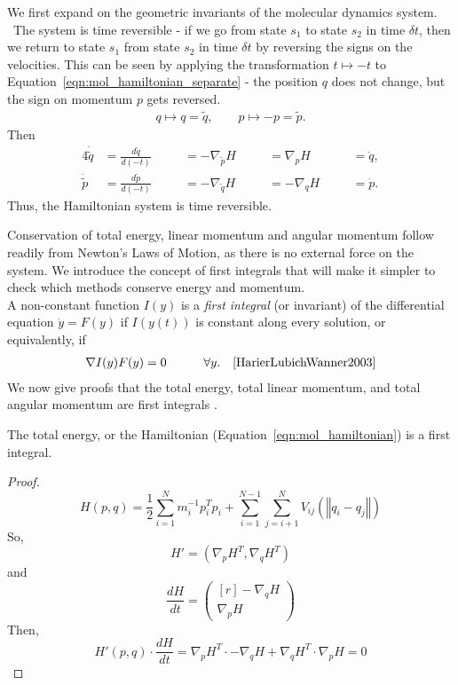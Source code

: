 \documentclass[../Main.tex]{subfiles}
\begin{document}
We first expand on the geometric invariants of the molecular dynamics system. \\\
The system is time reversible - if we go from state $s_{1}$ to state $s_{2}$ in time $\delta t$, then we return to state $s_{1}$ from state $s_{2}$ in time $\delta t$ by reversing the signs on the velocities. This can be seen by applying the transformation $t \mapsto -t$ to Equation~\ref{eqn:mol_hamiltonian_separate} - the position $q$ does not change, but the sign on momentum $p$ gets reversed.
\begin{align*}
q \mapsto q = \tilde{q},  \quad \quad p \mapsto -p = \tilde{p}.
\end{align*}
Then
\begin{alignat*}{4}
	\dot{\tilde{q}} &= \frac{d\tilde{q}}{d\left(-t\right)} \quad &&= -\nabla_{\tilde{p}}H \quad &&= \nabla_{p}H \quad &&= \dot{q},\\
	\dot{\tilde{p}} &= \frac{d\tilde{p}}{d\left(-t\right)} \quad &&= -\nabla_{\tilde{q}}H \quad && =-\nabla_{q}H \quad &&= \dot{p}.
\end{alignat*}
Thus, the Hamiltonian system is time reversible.

Conservation of total energy, linear momentum and angular momentum follow readily from Newton's Laws of Motion, as there is no external force on the system. We introduce the concept of first integrals that will make it simpler to check which methods conserve energy and momentum. \\
A non-constant function $I(y)$ is a \textit{first integral} (or invariant) of the  differential equation $\dot{y} = F(y)$ if $I(y(t))$ is constant along every solution, or equivalently, if
\begin{align}
\nabla I(y)F(y) = 0    \quad \quad \quad  \forall y. \quad \cite{HarierLubichWanner2003}
\end{align}
We now give proofs that the total energy, total linear momentum, and total angular momentum are first integrals \cite{HarierLubichWanner2003}.
\begin{theorem} The total energy, or the Hamiltonian (Equation~\ref{eqn:mol_hamiltonian}) is a first integral. \end{theorem}
\begin{proof}
$$
H(p, q) = \frac{1}{2}\sum_{i = 1}^{N} m_{i}^{-1}p_{i}^{T}p_{i} + \sum_{i=1}^{N-1} \sum_{j=i+1}^{N} V_{ij}\left(\left\Vert q_{i} - q_{j} \right\Vert\right)
$$
So,
$$
	H' = \left(\nabla_{p}H^{T}, \nabla_{q}H^{T}\right)
$$
and
$$
	\frac{dH}{dt} =
		\begin{pmatrix*}[r]
			-\nabla_{q}H \\
			\nabla_{p}H
		\end{pmatrix*}
$$
Then, 
$$
H'(p, q) \cdot \frac{dH}{dt} = \nabla_{p}H^{T}\cdot-\nabla_{q}H + \nabla_{q}H^{T}\cdot \nabla_{p}H = 0
$$ 
\end{proof} 
\end{document}
